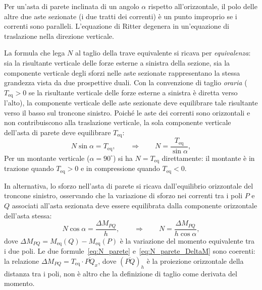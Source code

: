 Per un'asta di parete inclinata di un angolo $\alpha$
rispetto all'orizzontale, il polo delle altre due
aste sezionate (i due tratti dei correnti) è
un punto improprio se i correnti sono paralleli.
L'equazione di Ritter degenera in un'equazione
di traslazione nella direzione verticale.

La formula che lega $N$ al taglio della trave
equivalente si ricava per \emph{equivalenza}: sia
la risultante verticale delle forze esterne a
sinistra della sezione, sia la componente verticale
degli sforzi nelle aste sezionate rappresentano
la stessa grandezza vista da due prospettive duali.
Con la convenzione di taglio \emph{oraria}
($T_\text{eq} > 0$ se la risultante verticale
delle forze esterne a sinistra è diretta verso
l'alto), la componente verticale delle aste
sezionate deve equilibrare tale risultante verso
il basso sul troncone sinistro. Poiché le aste
dei correnti sono orizzontali e non contribuiscono
alla traslazione verticale, la sola componente
verticale dell'asta di parete deve equilibrare
$T_\text{eq}$:
\begin{equation}\label{eq:N_parete}
	N \sin\alpha = T_\text{eq},
	\qquad \Rightarrow \qquad
	N = \frac{T_\text{eq}}{\sin\alpha},
\end{equation}
Per un montante verticale ($\alpha = 90^\circ$) si ha
$N = T_\text{eq}$ direttamente: il montante è
in trazione quando $T_\text{eq} > 0$ e in
compressione quando $T_\text{eq} < 0$.

In alternativa, lo sforzo nell'asta di parete
si ricava dall'equilibrio orizzontale del troncone
sinistro, osservando che la variazione di sforzo
nei correnti tra i poli $P$ e $Q$ associati
all'asta sezionata deve essere equilibrata dalla
componente orizzontale dell'asta stessa:
\begin{equation}\label{eq:N_parete_DeltaM}
	N \cos\alpha = \frac{\Delta M_{PQ}}{h},
	\qquad \Rightarrow \qquad
	N = \frac{\Delta M_{PQ}}{h \cos\alpha},
\end{equation}
dove $\Delta M_{PQ} = M_\text{eq}(Q) - M_\text{eq}(P)$
è la variazione del momento equivalente tra i due poli.
Le due formule~\eqref{eq:N_parete}
e~\eqref{eq:N_parete_DeltaM} sono coerenti: la
relazione $\Delta M_{PQ} = T_\text{eq} \cdot \overline{PQ}_x$,
dove $(\overline{PQ})_h$ è la proiezione orizzontale
della distanza tra i poli, non è altro che la
definizione di taglio come derivata del momento.



